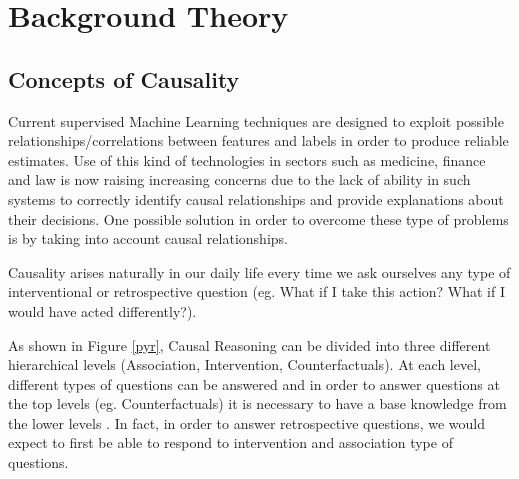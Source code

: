 \chapter{Background Theory}

  
\newenvironment{conditions}[1][where:]
  {#1 \begin{tabular}[t]{>{$}l<{$} @{${}={}$} l}}
  {\end{tabular}\\[\belowdisplayskip]}

\label{ch:background}

\section{Concepts of Causality}
\label{concepts}

Current supervised Machine Learning techniques are designed to exploit possible relationships/correlations between features and labels in order to produce reliable estimates. Use of this kind of technologies in sectors such as medicine, finance and law is now raising increasing concerns due to the lack of ability in such systems to correctly identify causal relationships and provide explanations about their decisions. One possible solution in order to overcome these type of problems is by taking into account causal relationships.

Causality arises naturally in our daily life every time we ask ourselves any type of interventional or retrospective question (eg. What if I take this action? What if I would have acted differently?).

As shown in Figure \ref{pyr}, Causal Reasoning can be divided into three different hierarchical levels (Association, Intervention, Counterfactuals). At each level, different types of questions can be answered and in order to answer questions at the top levels (eg. Counterfactuals) it is necessary to have a base knowledge from the lower levels \cite{tools}. In fact, in order to answer retrospective questions, we would expect to first be able to respond to intervention and association type of questions.

